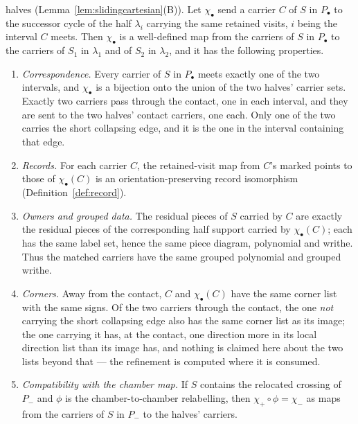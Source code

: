 \begin{lemma}
\begin{enumerate}
halves (Lemma~\ref{lem:slidingcartesian}(B)). Let $\chi_\bullet$ send a carrier $C$
of $S$ in $P_\bullet$ to the successor cycle of the half $\lambda_i$ carrying
the same retained visits, $i$ being the interval $C$ meets. Then $\chi_\bullet$
is a well-defined map from the carriers of $S$ in $P_\bullet$ to the carriers of
$S_1$ in $\lambda_1$ and of $S_2$ in $\lambda_2$, and it has the following
properties.
\begin{enumerate}
\item[(i)] \emph{Correspondence.} Every carrier of $S$ in $P_\bullet$ meets
exactly one of the two intervals, and $\chi_\bullet$ is a bijection onto the
union of the two halves' carrier sets. Exactly two carriers pass through the
contact, one in each interval, and they are sent to the two halves' contact
carriers, one each. Only one of the two carries the short collapsing edge, and
it is the one in the interval containing that edge.
\item[(ii)] \emph{Records.} For each carrier $C$, the retained-visit map from
$C$'s marked points to those of $\chi_\bullet(C)$ is an orientation-preserving
record isomorphism (Definition~\ref{def:record}).
\item[(iii)] \emph{Owners and grouped data.} The residual pieces of $S$ carried
by $C$ are exactly the residual pieces of the corresponding half support carried
by $\chi_\bullet(C)$; each has the same label set, hence the same piece diagram,
polynomial and writhe. Thus the matched carriers have the same grouped polynomial
and grouped writhe.
\item[(iv)] \emph{Corners.} Away from the contact, $C$ and $\chi_\bullet(C)$
have the same corner list with the same signs. Of the two carriers through the
contact, the one \emph{not} carrying the short collapsing edge also has the same
corner list as its image; the one carrying it has, at the contact, one direction
more in its local direction list than its image has, and nothing is claimed here
about the two lists beyond that --- the refinement is computed where it is
consumed.
\item[(v)] \emph{Compatibility with the chamber map.} If $S$ contains the
relocated crossing of $P_-$ and $\phi$ is the chamber-to-chamber relabelling,
then $\chi_+\circ\phi=\chi_-$ as maps from the carriers of $S$ in $P_-$ to the
halves' carriers.
\end{enumerate}
\end{enumerate}
\end{lemma}

